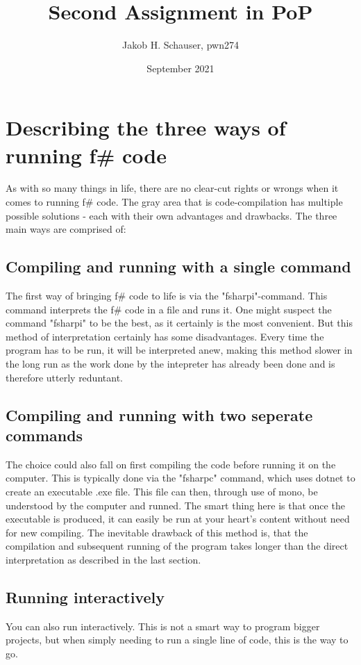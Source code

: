 \documentclass{article}
\title{Second Assignment in PoP}
\author{Jakob H. Schauser, pwn274}
\date{September 2021}
\begin{document}
\maketitle
\newpage
\newpage
\section{Describing the three ways of running f\# code}
As with so many things in life, there are no clear-cut rights or wrongs when it comes to running f\# code. The gray area that is code-compilation has multiple possible solutions
 - each with their own advantages and drawbacks. The three main ways are comprised of:
\subsection{Compiling and running with a single command}
The first way of bringing f\# code to life is via the "fsharpi"-command. This command interprets the f\# code in a file and runs it.
One might suspect the command "fsharpi" to be the best, as it certainly is the most convenient. But this method of interpretation certainly has some disadvantages. 
Every time the program has to be run, it will be interpreted anew, making this method slower in the long run as the work done by the intepreter has already been done and is 
therefore utterly reduntant.
\subsection{Compiling and running with two seperate commands}
The choice could also fall on first compiling the code before running it on the computer. This is typically done via the "fsharpc" command, which uses dotnet to create an 
executable .exe file. This file can then, through use of mono, be understood by the computer and runned. The smart thing here is that once the executable is produced, it can
easily be run at your heart's content without need for new compiling. The inevitable drawback of this method is, that the compilation and subsequent running of the program
takes longer than the direct interpretation as described in the last section.
\subsection{Running interactively}
You can also run interactively. This is not a smart way to program bigger projects, but when simply needing to run a single line of code, this is the way to go. 
\end{document}
